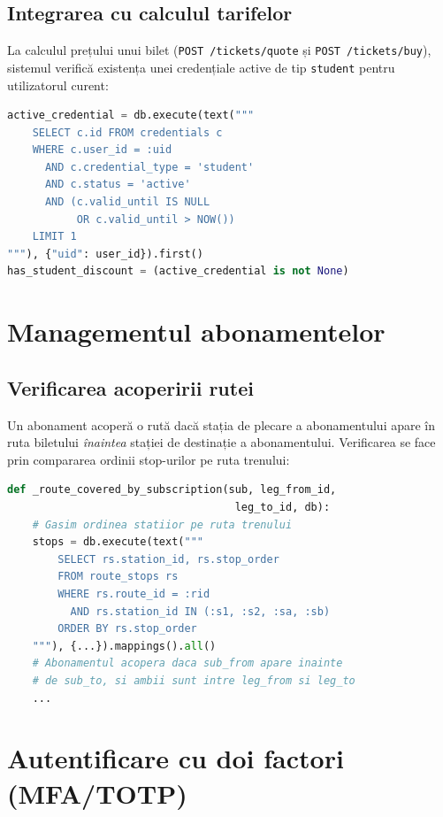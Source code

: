 \documentclass[12pt,a4paper]{report}
\begin{document}
\subsection{Integrarea cu calculul tarifelor}

La calculul prețului unui bilet (\texttt{POST /tickets/quote} și \texttt{POST /tickets/buy}), sistemul verifică existența unei credențiale active de tip \texttt{student} pentru utilizatorul curent:

\begin{lstlisting}[language=Python, caption=Verificare credentiala activa in calculul pretului]
active_credential = db.execute(text("""
    SELECT c.id FROM credentials c
    WHERE c.user_id = :uid
      AND c.credential_type = 'student'
      AND c.status = 'active'
      AND (c.valid_until IS NULL
           OR c.valid_until > NOW())
    LIMIT 1
"""), {"uid": user_id}).first()
has_student_discount = (active_credential is not None)
\end{lstlisting}

\section{Managementul abonamentelor}

\subsection{Verificarea acoperirii rutei}

Un abonament acoperă o rută dacă stația de plecare a abonamentului apare în ruta biletului \textit{înaintea} stației de destinație a abonamentului. Verificarea se face prin compararea ordinii stop-urilor pe ruta trenului:

\begin{lstlisting}[language=Python, caption=Verificare acoperire abonament pe ruta biletului]
def _route_covered_by_subscription(sub, leg_from_id,
                                    leg_to_id, db):
    # Gasim ordinea statiior pe ruta trenului
    stops = db.execute(text("""
        SELECT rs.station_id, rs.stop_order
        FROM route_stops rs
        WHERE rs.route_id = :rid
          AND rs.station_id IN (:s1, :s2, :sa, :sb)
        ORDER BY rs.stop_order
    """), {...}).mappings().all()
    # Abonamentul acopera daca sub_from apare inainte
    # de sub_to, si ambii sunt intre leg_from si leg_to
    ...
\end{lstlisting}

\section{Autentificare cu doi factori (MFA/TOTP)}
\end{document}
